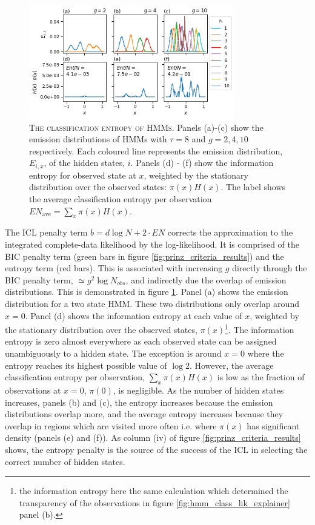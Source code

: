 \begin{figure}
    \centering
    \includegraphics[width=0.8\textwidth]{chapters/hmm_selection/figures/prinz_entropy.png}
    \caption[The classification entropy of HMMs]{\textsc{The classification entropy of HMMs}. Panels (a)-(c) show the emission distributions of HMMs with $\tau=8$ and $g = 2, 4, 10$ respectively. Each coloured line represents the emission distribution, $E_{i, x}$,  of the hidden states, $i$. Panels (d) - (f) show the information entropy for observed state at $x$, weighted by the stationary distribution over the observed states: $\pi(x)H(x)$. The label shows the average classification entropy per observation $EN_{\mathrm{ave}} = \sum_{x}\pi(x)H(x)$.}
    \label{fig:prinz_ent}
\end{figure}

The ICL penalty term $b=d\log{N}+2\cdot EN$ corrects the approximation to the integrated complete-data likelihood by the log-likelihood. It is comprised of the BIC penalty term (green bars in figure \ref{fig:prinz_criteria_results}) and the entropy term (red bars). This is associated with increasing $g$ directly through the BIC penalty term, $\simeq g^{2}\log{N_{obs}}$, and indirectly due the overlap of emission distributions. This is demonstrated in figure \ref{fig:prinz_ent}. Panel (a) shows the emission distribution for a two state HMM. These two distributions only overlap around $x=0$. Panel (d) shows the information entropy at each value of $x$, weighted by the stationary distribution over the observed states, $\pi(x)$\footnote{the information entropy here the same calculation which determined the transparency of the observations in figure \ref{fig:hmm_class_lik_explainer} panel (b).}. The information entropy is zero almost everywhere as each observed state can be assigned unambiguously to a hidden state. The exception is around $x=0$ where the entropy reaches its highest possible value of $\log{2}$. However, the average classification entropy per observation, $\sum_{x}\pi(x)H(x)$ is low as the fraction of observations at $x=0$, $\pi(0)$, is negligible. As the number of hidden states increases, panels (b) and (c), the  entropy increases because the emission distributions overlap more, and the average entropy increases because they overlap in regions which are visited more often i.e. where $\pi(x)$ has significant density (panels (e) and (f)). As column (iv) of figure \ref{fig:prinz_criteria_results} shows, the entropy penalty is the source of the success of the ICL in selecting  the correct number of hidden states. 

